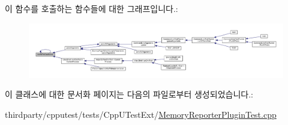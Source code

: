 이 함수를 호출하는 함수들에 대한 그래프입니다.\+:
\nopagebreak
\begin{figure}[H]
\begin{center}
\leavevmode
\includegraphics[width=350pt]{class_test_plugin_aa3524b10b0f1613104fa75f1c1a72cf6_icgraph}
\end{center}
\end{figure}




이 클래스에 대한 문서화 페이지는 다음의 파일로부터 생성되었습니다.\+:\begin{DoxyCompactItemize}
\item 
thirdparty/cpputest/tests/\+Cpp\+U\+Test\+Ext/\hyperlink{_memory_reporter_plugin_test_8cpp}{Memory\+Reporter\+Plugin\+Test.\+cpp}\end{DoxyCompactItemize}
